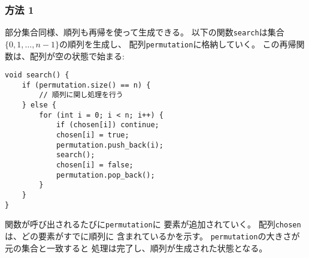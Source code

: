 \subsubsection{方法 1}

部分集合同様、順列も再帰を使って生成できる。
以下の関数\texttt{search}は集合$\{0,1,\ldots,n-1\}$の順列を生成し、
配列\texttt{permutation}に格納していく。
この再帰関数は、配列が空の状態で始まる:

\begin{lstlisting}
void search() {
    if (permutation.size() == n) {
        // 順列に関し処理を行う
    } else {
        for (int i = 0; i < n; i++) {
            if (chosen[i]) continue;
            chosen[i] = true;
            permutation.push_back(i);
            search();
            chosen[i] = false;
            permutation.pop_back();
        }
    }
}
\end{lstlisting}

\begin{comment}
Each function call adds a new element to
\texttt{permutation}.
The array \texttt{chosen} indicates which
elements are already included in the permutation.
If the size of \texttt{permutation} equals the size of the set,
a permutation has been generated.
\end{comment}

関数が呼び出されるたびに\texttt{permutation}に
要素が追加されていく。
配列\texttt{chosen}は、どの要素がすでに順列に
含まれているかを示す。
\texttt{permutation}の大きさが元の集合と一致すると
処理は完了し、順列が生成された状態となる。

\begin{comment}
\subsubsection{Method 2}

\index{next\_permutation@\texttt{next\_permutation}}

Another method for generating permutations
is to begin with the permutation
$\{0,1,\ldots,n-1\}$ and repeatedly
use a function that constructs the next permutation
in increasing order.
The C++ standard library contains the function
\texttt{next\_permutation} that can be used for this:

\begin{lstlisting}
vector<int> permutation;
for (int i = 0; i < n; i++) {
    permutation.push_back(i);
}
do {
    // process permutation
} while (next_permutation(permutation.begin(),permutation.end()));
\end{lstlisting}
\end{comment}

